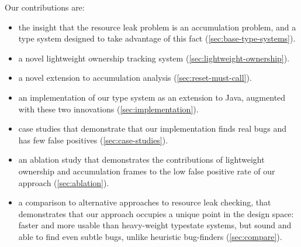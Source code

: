 Our contributions are:
\begin{itemize}
\item the insight that the resource leak problem is an accumulation problem,
  and a type system designed to take advantage of this fact (\cref{sec:base-type-systems}).
\item a novel lightweight ownership tracking system (\cref{sec:lightweight-ownership}).
\item a novel extension to accumulation analysis (\cref{sec:reset-must-call}).
\item an implementation of our type system as an extension to Java,
  augmented with these two innovations (\cref{sec:implementation}).
\item case studies that demonstrate that our implementation finds real
  bugs and has few false positives (\cref{sec:case-studies}).
\item an ablation study that demonstrates the contributions of
  lightweight ownership and accumulation frames to the low false
  positive rate of our approach (\cref{sec:ablation}). 
\item a comparison to alternative approaches to resource leak
  checking, that demonstrates that our approach occupies a unique
  point in the design space: faster and more usable than heavy-weight
  typestate systems, but sound and able to find even subtle bugs,
  unlike heuristic bug-finders (\cref{sec:compare}).
\end{itemize}
  
